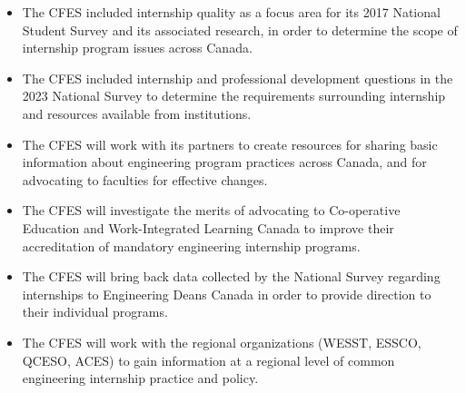 \begin{itemize}
 \item The CFES included internship quality as a focus area for its 2017 National Student Survey and its associated research, in order to determine the scope of internship program issues across Canada.
 \item The CFES included internship and professional development questions in the 2023 National Survey to determine the requirements surrounding internship and resources available from institutions.
\end{itemize}

\begin{itemize}
 \item The CFES will work with its partners to create resources for sharing basic information about engineering program practices across Canada, and for advocating to faculties for effective changes.
 \item The CFES will investigate the merits of advocating to Co-operative Education and Work-Integrated Learning Canada to improve their accreditation of mandatory engineering internship programs.
 \item The CFES will bring back data collected by the National Survey regarding internships to Engineering Deans Canada in order to provide direction to their individual programs.
 \item The CFES will work with the regional organizations (WESST, ESSCO, QCESO, ACES) to gain information at a regional level of common engineering internship practice and policy.
\end{itemize}

\newpage
